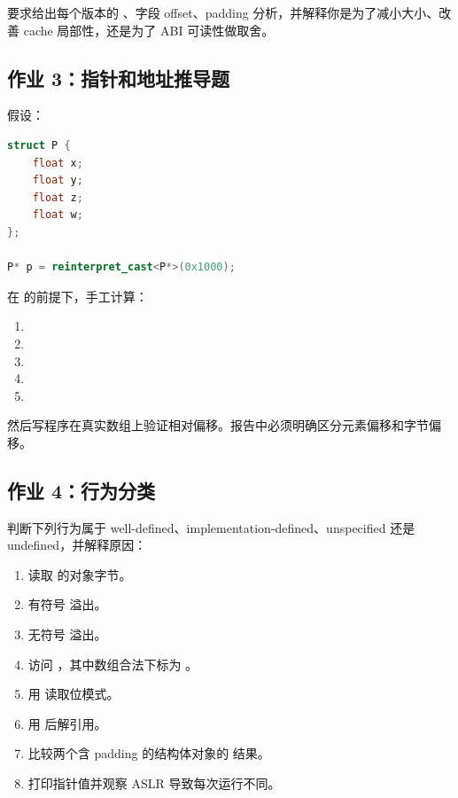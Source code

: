 \begin{exercisebox}
要求给出每个版本的 、字段 offset、padding 分析，并解释你是为了减小大小、改善 cache 局部性，还是为了 ABI 可读性做取舍。

\subsection*{作业 3：指针和地址推导题}

假设：

\begin{lstlisting}[language=C++]
struct P {
    float x;
    float y;
    float z;
    float w;
};

P* p = reinterpret_cast<P*>(0x1000);
\end{lstlisting}

在  的前提下，手工计算：

\begin{enumerate}
  \item {}
  \item {}
  \item {}
  \item {}
  \item {}
\end{enumerate}

然后写程序在真实数组上验证相对偏移。报告中必须明确区分元素偏移和字节偏移。

\subsection*{作业 4：行为分类}

判断下列行为属于 well-defined、implementation-defined、unspecified 还是 undefined，并解释原因：

\begin{enumerate}
  \item 读取  的对象字节。
  \item 有符号  溢出。
  \item 无符号  溢出。
  \item 访问 ，其中数组合法下标为 。
  \item 用  读取位模式。
  \item 用  后解引用。
  \item 比较两个含 padding 的结构体对象的  结果。
  \item 打印指针值并观察 ASLR 导致每次运行不同。
\end{enumerate}


\end{exercisebox}
